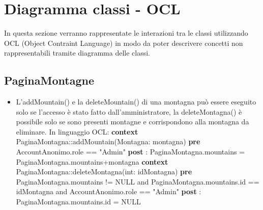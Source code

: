 \documentclass[a4paper,12pt]{article}
\begin{document}
\newpage
\section{Diagramma classi - OCL}
In questa sezione verranno rappresentate le interazioni tra le classi utilizzando OCL (Object Contraint Language) in modo da poter descrivere concetti non rappresentabili tramite diagramma delle classi.

\subsection{PaginaMontagne}
\begin{itemize}
   \item L'addMountain() e la deleteMountain() di una montagna può essere eseguito solo se l'accesso è stato fatto dall'amministratore, la deleteMontagna() è possibile solo se sono presenti montagne e corrispondono alla montagna da eliminare. \newline \newline
   In linguaggio OCL:\newline
   \textbf{context}  PaginaMontagna::addMountain(Montagna: montagna)\newline
    \textbf{pre} AccountAnonimo.role == "Admin" \newline
    \textbf{post} : PaginaMontagna.mountains = PaginaMontagna.mountains+montagna\newline\newline
    \textbf{context}  PaginaMontagna::deleteMontagna(int: idMontagna)\newline
    \textbf{pre} PaginaMontagna.mountains != NULL and PaginaMontagna.mountains.id == idMontagna and AccountAnonimo.role == "Admin" \newline
    \textbf{post} : PaginaMontagna.mountains.id = NULL 
\end{itemize}
\end{document}
